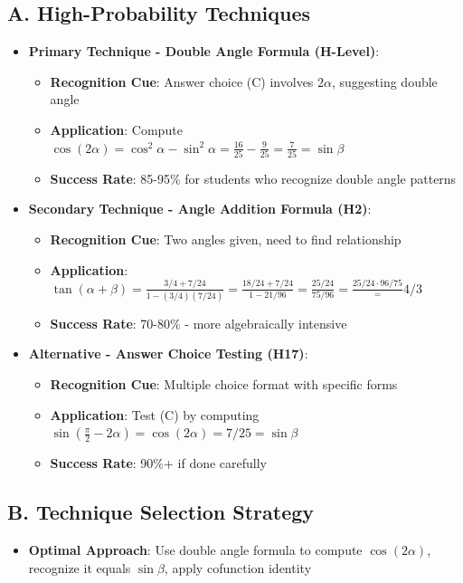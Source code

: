 \documentclass[11pt]{article}
\begin{document}
\begin{techniquesbox}
\subsection*{A. High-Probability Techniques}
\begin{itemize}[leftmargin=*]
    \item \textbf{Primary Technique - Double Angle Formula (H-Level)}: 
    \begin{itemize}
        \item \textbf{Recognition Cue}: Answer choice (C) involves $2\alpha$, suggesting double angle
        \item \textbf{Application}: Compute $\cos(2\alpha) = \cos^2\alpha - \sin^2\alpha = \frac{16}{25} - \frac{9}{25} = \frac{7}{25} = \sin\beta$
        \item \textbf{Success Rate}: 85-95\% for students who recognize double angle patterns
    \end{itemize}
    
    \item \textbf{Secondary Technique - Angle Addition Formula (H2)}: 
    \begin{itemize}
        \item \textbf{Recognition Cue}: Two angles given, need to find relationship
        \item \textbf{Application}: $\tan(\alpha + \beta) = \frac{3/4 + 7/24}{1 - (3/4)(7/24)} = \frac{18/24 + 7/24}{1 - 21/96} = \frac{25/24}{75/96} = \frac{25/24 \cdot 96/75} = 4/3$
        \item \textbf{Success Rate}: 70-80\% - more algebraically intensive
    \end{itemize}
    
    \item \textbf{Alternative - Answer Choice Testing (H17)}: 
    \begin{itemize}
        \item \textbf{Recognition Cue}: Multiple choice format with specific forms
        \item \textbf{Application}: Test (C) by computing $\sin\left(\frac{\pi}{2} - 2\alpha\right) = \cos(2\alpha) = 7/25 = \sin\beta$ \checkmark
        \item \textbf{Success Rate}: 90\%+ if done carefully
    \end{itemize}
\end{itemize}

\subsection*{B. Technique Selection Strategy}
\begin{itemize}[leftmargin=*]
    \item \textbf{Optimal Approach}: Use double angle formula to compute $\cos(2\alpha)$, recognize it equals $\sin\beta$, apply cofunction identity
    

\end{itemize}
\end{techniquesbox}
\end{document}
